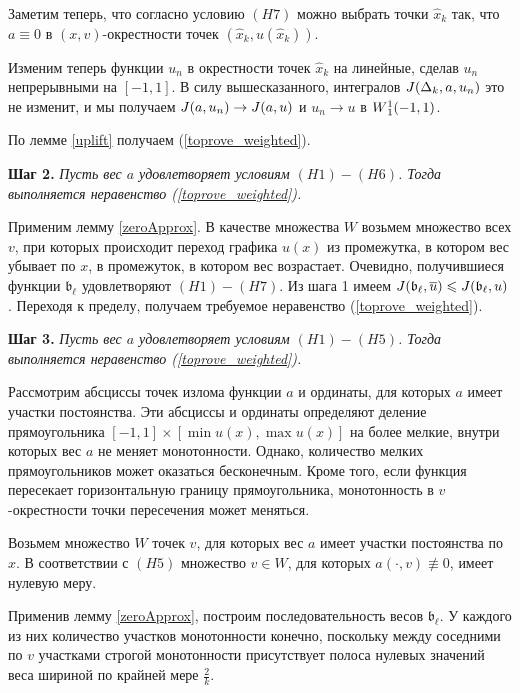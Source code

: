 Заметим теперь, что согласно условию $(H7)$ можно выбрать точки $\hat{x}_k$ так,
что $a \equiv 0$ в $(x, v)$-окрестности точек $(\hat{x}_k, u(\hat{x}_k))$.

Изменим теперь функции $u_n$ в окрестности точек $\hat{x}_k$ на линейные,
сделав $u_n$ непрерывными на $[-1, 1]$.
В силу вышесказанного, интегралов $J(\Delta_k, a, u_n)$ это не изменит,
и мы получаем $J(a, u_n) \to J(a, u)$ и $u_n \to u$ в $W{}_1^1(-1, 1)$.

По лемме \ref{uplift} получаем (\ref{toprove_weighted}).

\bigskip

\textbf{Шаг 2.}
\textit{Пусть вес $a$ удовлетворяет условиям $(H1)-(H6)$.
Тогда выполняется неравенство (\ref{toprove_weighted}).}

Применим лемму \ref{zeroApprox}.
В качестве множества $W$ возьмем множество всех $v$,
при которых происходит переход графика $u(x)$ из промежутка,
в котором вес убывает по $x$, в промежуток, в котором вес возрастает.
Очевидно, получившиеся функции $\mathfrak b_{\ell}$ удовлетворяют $(H1)-(H7)$.
Из шага 1 имеем $\IWg(\mathfrak b_{\ell}, \mon{u}) \le \IWg(\mathfrak b_{\ell}, u)$.
Переходя к пределу, получаем требуемое неравенство (\ref{toprove_weighted}).

\bigskip

\textbf{Шаг 3.}
\textit{Пусть вес $a$ удовлетворяет условиям $(H1)-(H5)$.
Тогда выполняется неравенство (\ref{toprove_weighted}).}

Рассмотрим абсциссы точек излома функции $a$ и ординаты, для которых $a$ имеет участки постоянства.
Эти абсциссы и ординаты определяют деление прямоугольника $[-1, 1] \times [\min u(x), \max u(x)]$
на более мелкие, внутри которых вес $a$ не меняет монотонности.
Однако, количество мелких прямоугольников может оказаться бесконечным.
Кроме того, если функция пересекает горизонтальную границу прямоугольника,
монотонность в $v$-окрестности точки пересечения может меняться.

Возьмем множество $W$ точек $v$, для которых вес $a$ имеет участки постоянства по $x$.
В соответствии с $(H5)$ множество $v \in W$, для которых $a(\cdot, v) \not\equiv 0$, имеет нулевую меру.

Применив лемму \ref{zeroApprox}, построим последовательность весов $\mathfrak b_{\ell}$.
У каждого из них количество участков монотонности конечно,
поскольку между соседними по $v$ участками строгой монотонности
присутствует полоса нулевых значений веса шириной по крайней мере $\frac{2}{k}$.

